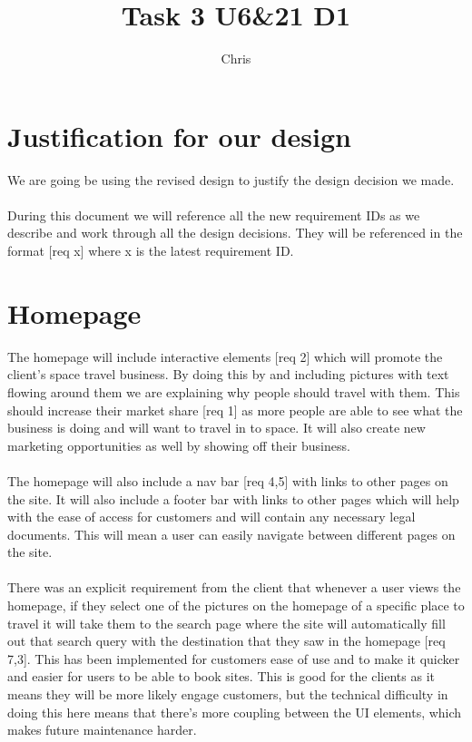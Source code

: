\documentclass{article}
\title{Task 3 U6\&21 D1}
\author{Chris}
\begin{document}
\maketitle

\section{Justification for our design}
We are going be using the revised design to justify the design decision we made.
\\
\\
During this document we will reference all the new requirement IDs as we describe and work through all the design decisions. They will be referenced in the format [req x] where x is the latest requirement ID.
\\
\section{Homepage}

The homepage will include interactive elements [req 2] which will promote the client's space travel business. By doing this by and including pictures with text flowing around them we are explaining why people should travel with them. This should increase their market share [req 1] as more people are able to see what the business is doing and will want to travel in to space. It will also create new marketing opportunities as well by showing off their business.
\\
\\
The homepage will also include a nav bar [req 4,5] with links to other pages on the site. It will also include a footer bar with links to other pages which will help with the ease of access for customers and will contain any necessary legal documents. This will mean a user can easily navigate between different pages on the site. 
\\
\\
 There was an explicit requirement from the client that whenever a user views the homepage, if they select one of the pictures on the homepage of a specific place to travel it will take them to the search page where the site will automatically fill out that search query with the destination that they saw in the homepage [req 7,3]. This has been implemented for customers ease of use and to make it quicker and easier for users to be able to book sites. This is good for the clients as it means they will be more likely engage customers, but the technical difficulty in doing this here means that there's more coupling between the UI elements, which makes future maintenance harder.
\\
\\
\end{document}
